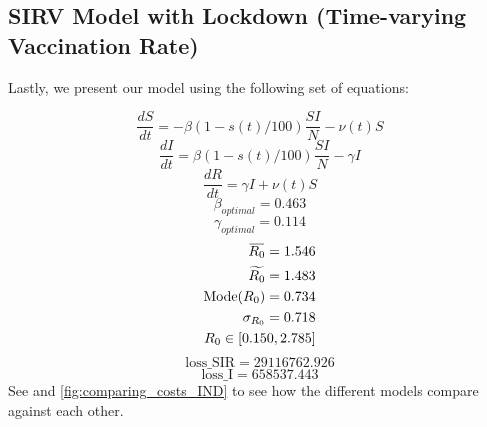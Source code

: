 \documentclass[tikz,fleqn,12pt]{wlscirep}
\newcommand{\overbar}[1]{\mkern 1.5mu\overline{\mkern-1.5mu#1\mkern-1.5mu}\mkern 1.5mu}
\begin{document}
\subsection{SIRV Model with Lockdown (Time-varying Vaccination Rate)}
Lastly, we present our model using the following set of equations:
\begin{figure}[htbp!]
\end{figure}
\begin{equation}
  \frac{dS}{dt} = -\beta  (1 - s(t)/100)  \frac{S I}{N} - \nu(t) S
  \label{eq:S_with_lockdown_and_time_varying_nu}
\end{equation}
\begin{equation}
  \frac{dI}{dt} = \beta  (1 - s(t)/100) \frac{S I}{N} - \gamma I
  \label{eq:I_with_lockdown_and_time_varying_nu}
\end{equation}
\begin{equation}
  \frac{dR}{dt} = \gamma I + \nu(t) S
  \label{eq:R_with_lockdown_and_time_varying_nu}
\end{equation}
\begin{equation}
  \beta_{optimal} = 0.463
  \label{eq:beta_optimal_with_lockdown_and_time_varying_nu}
\end{equation}
\begin{equation}
  \gamma_{optimal} = 0.114
  \label{eq:gamma_optimal_with_lockdown_and_time_varying_nu}
\end{equation}
\begin{equation}
  \begin{split}
    \overbar{R_0} = 1.546 \\
    \widetilde{R_0} = 1.483 \\
    \text{Mode}(R_0) = 0.734 \\
    \sigma_{R_0} = 0.718 \\
    R_0 \in [0.150, 2.785]
  \end{split}
  \label{eq:r0_with_lockdown_and_time_varying_nu}
\end{equation}
\begin{equation}
  \textrm{loss\_SIR} = 29116762.926
  \label{eq:cost_SIR_with_lockdown_and_time_varying_nu}
\end{equation}
\begin{equation}
  \textrm{loss\_I} = 658537.443
  \label{eq:cost_I_with_lockdown_and_time_varying_nu}
\end{equation}
See  and \cref{fig:comparing_costs_IND} to see how the different models compare against each other.
\end{document}
